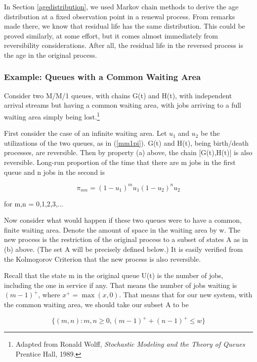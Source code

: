 In Section \ref{agedistribution}, we used Markov chain methods to derive
the age distribution at a fixed observation point in a renewal process.
From remarks made there, we know that residual life has the same
distribution.  This could be proved similarly, at some effort, but it
comes almost immediately from reversibility considerations.  After all,
the residual life in the reversed process is the age in the original
process.

\subsubsection{Example:  Queues with a Common Waiting Area}

Consider two M/M/1 queues, with chains G(t) and H(t), with independent
arrival streams but having a common waiting area, with jobs arriving to
a full waiting area simply being lost.\footnote{Adapted from Ronald
Wolff, {\it Stochastic Modeling and the Theory of Queues} Prentice Hall,
1989.} 

First consider the case of an infinite waiting area.  Let $u_1$ and
$u_2$ be the utilizations of the two queues, as in (\ref{mm1pi}).  G(t)
and H(t), being birth/death processes, are reversible.  Then by property
(a) above, the chain [G(t),H(t)] is also reversible.  Long-run
proportion of the time that there are m jobs in the first queue and n
jobs in the second is

\begin{equation}
\pi_{mn} = (1-u_1)^m u_1 (1-u_2)^n u_2 
\end{equation}

for m,n = 0,1,2,3,...

Now consider what would happen if these two queues were to have a
common, finite waiting area.  Denote the amount of space in the waiting
area by w.  The new process is the restriction of the original process
to a subset of states A as in (b) above.  (The set A will be precisely
defined below.)  It is easily verified from the Kolmogorov Criterion
that the new process is also reversible.

Recall that the state m in the original queue U(t) is the number of
jobs, including the one in service if any.  That means the number of
jobs waiting is $(m-1)^+$, where $x^+ = \max(x,0)$.  That means that for
our new system, with the common waiting area, we should take our subset
A to be

\begin{equation}
\{ (m,n): m,n \geq 0, (m-1)^+ + (n-1)^+ \leq w \}
\end{equation}

